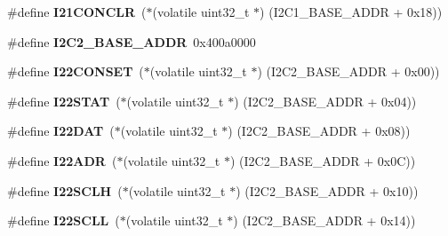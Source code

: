 \begin{DoxyCompactItemize}
\mbox{\label{group__lpc24xx__regs_gad9861a20f818155f560adf4df72ed80a}} 
\#define {\bfseries I21\+C\+O\+N\+C\+LR}~($\ast$(volatile uint32\+\_\+t $\ast$) (I2\+C1\+\_\+\+B\+A\+S\+E\+\_\+\+A\+D\+DR + 0x18))
\item 
\mbox{\label{group__lpc24xx__regs_gac2fed30a475b0e622158afa3f93c4cba}} 
\#define {\bfseries I2\+C2\+\_\+\+B\+A\+S\+E\+\_\+\+A\+D\+DR}~0x400a0000
\item 
\mbox{\label{group__lpc24xx__regs_ga3a20ab5b3b453a593c10833ddd46d5c3}} 
\#define {\bfseries I22\+C\+O\+N\+S\+ET}~($\ast$(volatile uint32\+\_\+t $\ast$) (I2\+C2\+\_\+\+B\+A\+S\+E\+\_\+\+A\+D\+DR + 0x00))
\item 
\mbox{\label{group__lpc24xx__regs_ga2639ce31daaaaf9a8cacdad8d81fe475}} 
\#define {\bfseries I22\+S\+T\+AT}~($\ast$(volatile uint32\+\_\+t $\ast$) (I2\+C2\+\_\+\+B\+A\+S\+E\+\_\+\+A\+D\+DR + 0x04))
\item 
\mbox{\label{group__lpc24xx__regs_ga9c0f71a1a956975b0225622a127ca875}} 
\#define {\bfseries I22\+D\+AT}~($\ast$(volatile uint32\+\_\+t $\ast$) (I2\+C2\+\_\+\+B\+A\+S\+E\+\_\+\+A\+D\+DR + 0x08))
\item 
\mbox{\label{group__lpc24xx__regs_ga370e6d6030c804494d075bcf13e3e87b}} 
\#define {\bfseries I22\+A\+DR}~($\ast$(volatile uint32\+\_\+t $\ast$) (I2\+C2\+\_\+\+B\+A\+S\+E\+\_\+\+A\+D\+DR + 0x0\+C))
\item 
\mbox{\label{group__lpc24xx__regs_gab6e02d65ea2eb5ec39c21dce641b90bc}} 
\#define {\bfseries I22\+S\+C\+LH}~($\ast$(volatile uint32\+\_\+t $\ast$) (I2\+C2\+\_\+\+B\+A\+S\+E\+\_\+\+A\+D\+DR + 0x10))
\item 
\mbox{\label{group__lpc24xx__regs_gabb9398e218ad4b3782200053f545c055}} 
\#define {\bfseries I22\+S\+C\+LL}~($\ast$(volatile uint32\+\_\+t $\ast$) (I2\+C2\+\_\+\+B\+A\+S\+E\+\_\+\+A\+D\+DR + 0x14))
\item 
\mbox{\label{group__lpc24xx__regs_gaadeac5f547736533d0459f74b18db020}} 

\end{DoxyCompactItemize}
